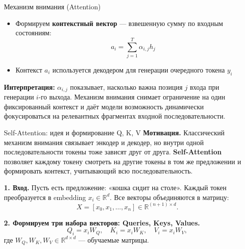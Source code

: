 \documentclass[aspectratio=1610,12pt]{beamer}
\begin{document}
\begin{frame}{Механизм внимания (Attention)}
\begin{itemize}
  \item Формируем \textbf{контекстный вектор} — взвешенную сумму по входным состояниям:
  \[
  a_i = \sum_{j=1}^T \alpha_{i,j} h_j
  \]
  \item Контекст $a_i$ используется декодером для генерации очередного токена $y_i$
\end{itemize}

\footnotesize
\vspace{0.3em}
\textbf{Интерпретация:} $\alpha_{i,j}$ показывает, насколько важна позиция $j$ входа при генерации $i$-го выхода.
Механизм внимания снимает ограничение на один фиксированный контекст и даёт модели возможность
динамически фокусироваться на релевантных фрагментах входной последовательности.
\end{frame}


\begin{frame}{Self-Attention: идея и формирование Q, K, V}
\small
\textbf{Мотивация.}
Классический механизм внимания связывает энкодер и декодер,
но внутри одной последовательности токены тоже зависят друг от друга.
\textbf{Self-Attention} позволяет каждому токену смотреть на другие токены
в том же предложении и формировать контекст, учитывающий всю последовательность.

\vspace{0.4em}
\textbf{1. Вход.}
Пусть есть предложение: «кошка сидит на столе».
Каждый токен преобразуется в embedding $x_i \in \mathbb{R}^d$.
Все векторы объединяются в матрицу:
\[
X = [x_0, x_1, \dots, x_n] \in \mathbb{R}^{(n+1)\times d}.
\]

\vspace{0.4em}
\textbf{2. Формируем три набора векторов: Queries, Keys, Values.}
\[
Q_i = x_i W_Q, \quad K_i = x_i W_K, \quad V_i = x_i W_V,
\]
где $W_Q, W_K, W_V \in \mathbb{R}^{d\times d}$ — обучаемые матрицы.
\end{frame}
\end{document}
